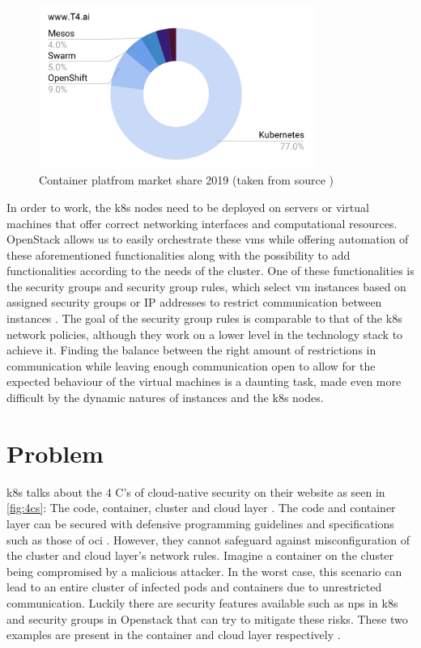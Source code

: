 \begin{figure}[htbp]
  \centering
  \includegraphics[width=0.8\textwidth]{images/appl-container-market-share.png}
  \caption{Container platfrom market share 2019 (taken from source \cite{t4})}
  \label{fig:mark-share}
\end{figure}

In order to work, the \acrshort{k8s} nodes need to be deployed on servers or virtual machines that offer correct networking interfaces and computational resources. OpenStack allows us to easily orchestrate these \acrshort{vm}s while offering automation of these aforementioned functionalities along with the possibility to add functionalities according to the needs of the cluster. One of these functionalities is the security groups and security group rules, which select \acrshort{vm} instances based on assigned security groups or IP addresses to restrict communication between instances \cite{sg} \cite{sgrule}. The goal of the security group rules is comparable to that of the \acrshort{k8s} network policies, although they work on a lower level in the technology stack to achieve it. Finding the balance between the right amount of restrictions in communication while leaving enough communication open to allow for the expected behaviour of the virtual machines is a daunting task, made even more difficult by the dynamic natures of instances and the \acrshort{k8s} nodes.


\section{Problem} \label{sec:problem}
\acrshort{k8s} talks about the 4 C’s of cloud-native security on their website as seen in \autoref{fig:4cs}: The code, container, cluster and cloud layer \cite{4cs}. The code and container layer can be secured with defensive programming guidelines \cite{defensiveprogramming} and specifications such as those of \acrshort{oci} \cite{OCI}. However, they cannot safeguard against misconfiguration of the cluster and cloud layer's network rules. Imagine a container on the cluster being compromised by a malicious attacker. In the worst case, this scenario can lead to an entire cluster of infected pods and containers due to unrestricted communication. Luckily there are security features available such as \acrshort{np}s in \acrshort{k8s} and security groups in Openstack that can try to mitigate these risks. These two examples are present in the container and cloud layer respectively \cite{nps} \cite{secgroups}.
\\[10pt]


